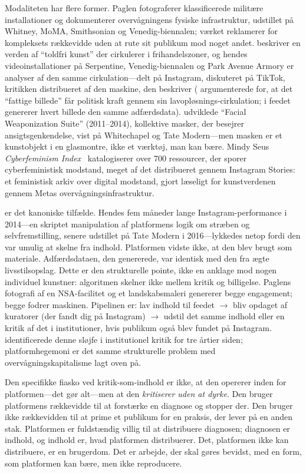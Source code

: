 \documentclass[10pt,letterpaper,twocolumn]{article}
\begin{document}
Modaliteten har flere former. Paglen fotograferer klassificerede militære installationer og dokumenterer overvågningens fysiske infrastruktur, udstillet på Whitney, MoMA, Smithsonian og Venedig-biennalen; værket reklamerer for kompleksets rækkevidde uden at rute sit publikum mod noget andet. \citet{steyerl2017duty} beskriver en verden af ``toldfri kunst'' der cirkulerer i frihandelszoner, og hendes videoinstallationer på Serpentine, Venedig-biennalen og Park Avenue Armory er analyser af den samme cirkulation---delt på Instagram, diskuteret på TikTok, kritikken distribueret af den maskine, den beskriver (\citet{steyerl2009poor} argumenterede for, at det ``fattige billede'' får politisk kraft gennem sin lavopløsnings-cirkulation; i feedet genererer hvert billede den samme adfærdsdata). \citet{blas2014informatic} udviklede ``Facial Weaponization Suite'' (2011--2014), kollektive masker, der besejrer ansigtsgenkendelse, vist på Whitechapel og Tate Modern---men masken er et kunstobjekt i en glasmontre, ikke et værktøj, man kan bære. Mindy Seus \emph{Cyberfeminism Index}~\citep{seu2023cyberfeminism} katalogiserer over 700 ressourcer, der sporer cyberfeministisk modstand, meget af det distribueret gennem Instagram Stories: et feministisk arkiv over digital modstand, gjort læseligt for kunstverdenen gennem Metas overvågningsinfrastruktur.

\citet{ulman2014excellences} er det kanoniske tilfælde. Hendes fem måneder lange Instagram-performance i 2014---en skriptet manipulation af platformens logik om stræben og selvfremstilling, senere udstillet på Tate Modern i 2016---lykkedes netop fordi den var umulig at skelne fra indhold. Platformen vidste ikke, at den blev brugt som materiale. Adfærdsdataen, den genererede, var identisk med den fra ægte livsstilsopslag. Dette er den strukturelle pointe, ikke en anklage mod nogen individuel kunstner: algoritmen skelner ikke mellem kritik og billigelse. Paglens fotografi af en NSA-facilitet og et landskabsmaleri genererer begge engagement; begge fodrer maskinen. Pipelinen er: lav indhold til feedet $\rightarrow$ bliv opdaget af kuratorer (der fandt dig på Instagram) $\rightarrow$ udstil det samme indhold eller en kritik af det i institutioner, hvis publikum også blev fundet på Instagram. \citet{fraser2005critique} identificerede denne sløjfe i institutionel kritik for tre årtier siden; platformhegemoni er det samme strukturelle problem med overvågningskapitalisme lagt oven på.

Den specifikke fiasko ved kritik-som-indhold er ikke, at den opererer inden for platformen---det gør alt---men at den \emph{kritiserer uden at dyrke}. Den bruger platformens rækkevidde til at forstærke en diagnose og stopper der. Den bruger ikke rækkevidden til at prime et publikum for en praksis, der lever på en anden stak. Platformen er fuldstændig villig til at distribuere diagnosen; diagnosen er indhold, og indhold er, hvad platformen distribuerer. Det, platformen ikke kan distribuere, er en brugerdom. Det er arbejde, der skal gøres bevidst, med en form, som platformen kan bære, men ikke reproducere.
\end{document}
